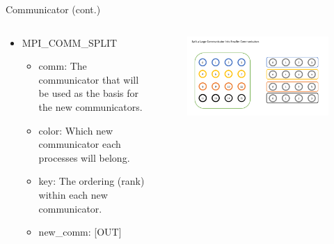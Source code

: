 \begin{frame}{Communicator (cont.)}
\begin{columns}
    \begin{column}{.6\textwidth}
    \begin{itemize}
        \item MPI\_COMM\_SPLIT

        \begin{itemize}
            \item comm: The communicator that will be used as the basis for the new communicators.
            \item color: Which new communicator each processes will belong.
            \item key: The ordering (rank) within each new communicator.
            \item new\_comm: [OUT]
        \end{itemize}
    \end{itemize}
    \end{column}
        \begin{column}{.4\textwidth}
        \begin{figure}
            \centering
            \includegraphics[width=1.0\linewidth]{day8_am/img/mpi/commsplit.png}
        \end{figure}
    \end{column}
\end{columns}

\end{frame}

